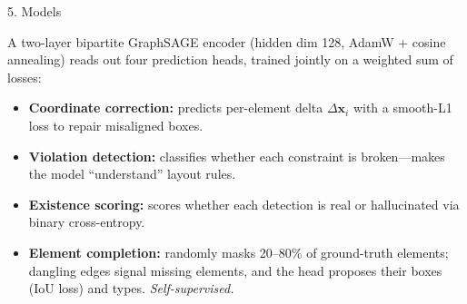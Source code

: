\documentclass[final]{beamer}
\newlength{\colwidth}
\begin{document}
\begin{frame}[t]
\begin{columns}[t]
\begin{column}{\colwidth}
\begin{center}
    \end{center}



  \begin{block}{5. Models}



    A two-layer bipartite GraphSAGE encoder (hidden dim 128, AdamW + cosine
    annealing) reads out four prediction heads, trained jointly on a
    weighted sum of losses:

    \begin{itemize}
      \item \textbf{Coordinate correction:} predicts per-element delta
        $\Delta\mathbf{x}_i$ with a smooth-L1 loss to repair misaligned
        boxes.
      \item \textbf{Violation detection:} classifies whether each constraint
        is broken---makes the model ``understand'' layout rules.
      \item \textbf{Existence scoring:} scores whether each detection is
        real or hallucinated via binary cross-entropy.
      \item \textbf{Element completion:} randomly masks 20--80\% of
        ground-truth elements; dangling edges signal missing elements, and
        the head proposes their boxes (IoU loss) and types.
        \emph{Self-supervised.}
    \end{itemize}


\end{block}
\end{column}
\end{columns}
\end{frame}
\end{document}
